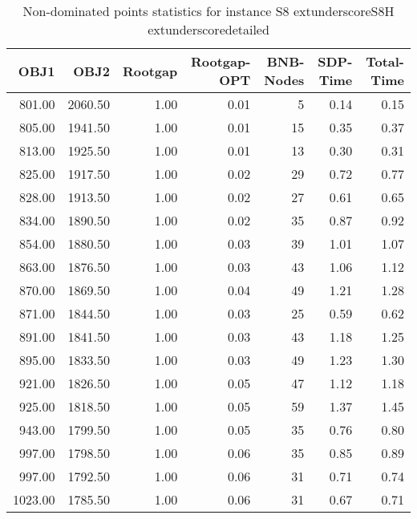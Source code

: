 \begin{table}
\caption{Non-dominated points statistics for instance S8	extunderscoreS8H	extunderscoredetailed}
\label{tab:stats/S8_S8H_detailed}
\begin{tabular}{rrrrrrr}
\toprule
OBJ1 & OBJ2 & Rootgap & Rootgap-OPT & BNB-Nodes & SDP-Time & Total-Time \\
\midrule
801.00 & 2060.50 & 1.00 & 0.01 & 5 & 0.14 & 0.15 \\
805.00 & 1941.50 & 1.00 & 0.01 & 15 & 0.35 & 0.37 \\
813.00 & 1925.50 & 1.00 & 0.01 & 13 & 0.30 & 0.31 \\
825.00 & 1917.50 & 1.00 & 0.02 & 29 & 0.72 & 0.77 \\
828.00 & 1913.50 & 1.00 & 0.02 & 27 & 0.61 & 0.65 \\
834.00 & 1890.50 & 1.00 & 0.02 & 35 & 0.87 & 0.92 \\
854.00 & 1880.50 & 1.00 & 0.03 & 39 & 1.01 & 1.07 \\
863.00 & 1876.50 & 1.00 & 0.03 & 43 & 1.06 & 1.12 \\
870.00 & 1869.50 & 1.00 & 0.04 & 49 & 1.21 & 1.28 \\
871.00 & 1844.50 & 1.00 & 0.03 & 25 & 0.59 & 0.62 \\
891.00 & 1841.50 & 1.00 & 0.03 & 43 & 1.18 & 1.25 \\
895.00 & 1833.50 & 1.00 & 0.03 & 49 & 1.23 & 1.30 \\
921.00 & 1826.50 & 1.00 & 0.05 & 47 & 1.12 & 1.18 \\
925.00 & 1818.50 & 1.00 & 0.05 & 59 & 1.37 & 1.45 \\
943.00 & 1799.50 & 1.00 & 0.05 & 35 & 0.76 & 0.80 \\
997.00 & 1798.50 & 1.00 & 0.06 & 35 & 0.85 & 0.89 \\
997.00 & 1792.50 & 1.00 & 0.06 & 31 & 0.71 & 0.74 \\
1023.00 & 1785.50 & 1.00 & 0.06 & 31 & 0.67 & 0.71 \\
\bottomrule
\end{tabular}
\end{table}
